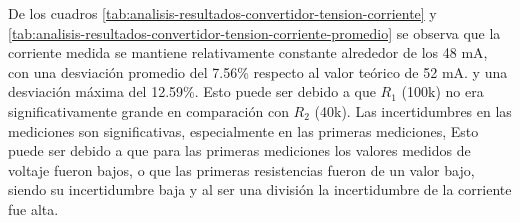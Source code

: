 De los cuadros \ref{tab:analisis-resultados-convertidor-tension-corriente} y \ref{tab:analisis-resultados-convertidor-tension-corriente-promedio} se observa que la corriente medida se mantiene relativamente constante alrededor de los 48 mA, con una desviación promedio del 7.56\% respecto al valor teórico de 52 mA. y una desviación máxima del 12.59\%. Esto puede ser debido a que $R_1$ (100k) no era significativamente grande en comparación con $R_2$ (40k). Las incertidumbres en las mediciones son significativas, especialmente en las primeras mediciones, Esto puede ser debido a que para las primeras mediciones los valores medidos de voltaje fueron bajos, o que las primeras resistencias fueron de un valor bajo, siendo su incertidumbre baja y al ser una división la incertidumbre de la corriente fue alta.